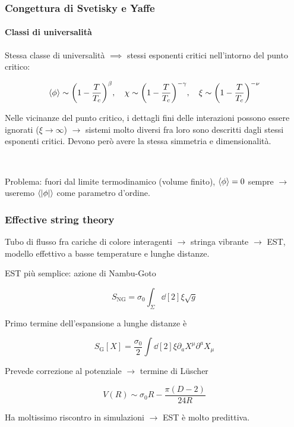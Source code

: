 \documentclass{beamer}
\begin{document}
\begin{frame}
	\frametitle{Congettura di Svetisky e Yaffe}
	\framesubtitle{Classi di universalità}

	Stessa classe di universalità $\implies$ stessi \alert{esponenti critici} nell'intorno del punto critico:

	\begin{equation*}
		\expval{\phi} \sim \qty(1 - \frac{T}{T_c})^\beta \qc 
		\chi \sim \qty(1 - \frac{T}{T_c})^{-\gamma} \qc 
		\xi \sim \qty(1 - \frac{T}{T_c})^{-\nu}
	\end{equation*}

	Nelle vicinanze del punto critico, i dettagli fini delle interazioni possono essere ignorati ($\xi \rightarrow \infty$)
	$\rightarrow$ sistemi molto diversi fra loro sono descritti dagli stessi esponenti critici. Devono però avere
	la stessa \alert{simmetria e dimensionalità}. 

	\

	Problema: fuori dal limite termodinamico (volume finito), $\expval{\phi} = 0$ sempre $\rightarrow$
	useremo $\expval{|\phi|}$ come parametro d'ordine.

\end{frame}

\begin{frame}
	\frametitle{Effective string theory}

	Tubo di flusso fra cariche di colore interagenti $\rightarrow$ stringa vibrante $\rightarrow$ EST, modello
	effettivo a basse temperature e lunghe distanze.

	EST più semplice: \alert{azione di Nambu-Goto}

	\begin{equation*}
		S_\text{NG} = \sigma_0 \int_\Sigma \dd[2]\xi \sqrt{g}
	\end{equation*}

	Primo termine dell'espansione a lunghe distanze è 

	\begin{equation*}
		S_\text{G}[X] = \frac{\sigma_0}{2} \int \dd[2]{\xi} \partial_a X^\mu \partial^a X_\mu
	\end{equation*}

	Prevede correzione al potenziale $\rightarrow$ \alert{termine di L{\"u}scher}

	\begin{equation*}
		V(R) \sim \sigma_0 R - \frac{\pi (D-2)}{24R}
	\end{equation*}

	Ha moltissimo riscontro in simulazioni $\rightarrow$ EST è molto predittiva.
	
\end{frame}
\end{document}

